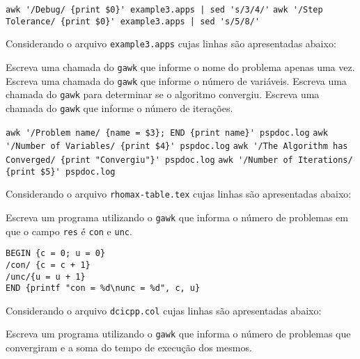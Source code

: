 \begin{Answer}[ref={0004}]
    \Question \lstinline+awk '/Debug/ {print $0}' example3.apps | sed 's/3/4/'+
    \Question \lstinline+awk '/Step Tolerance/ {print $0}' example3.apps | sed 's/5/8/'+
\end{Answer}
\begin{Exercise}[label={0005}, difficulty={1}, origin={gawk}]
  Considerando o arquivo \lstinline+example3.apps+ cujas linhas são
  apresentadas abaixo:
  
    \Question Escreva uma chamada do \lstinline+gawk+ que informe o nome do
      problema apenas uma vez.
    \Question Escreva uma chamada do \lstinline+gawk+ que informe o número de
      variáveis.
    \Question Escreva uma chamada do \lstinline+gawk+ para determinar se o algoritmo
      convergiu.
    \Question Escreva uma chamada do \lstinline+gawk+ que informe o número de
      iterações.
\end{Exercise}

\begin{Answer}[ref={0005}]
    \Question \lstinline+awk '/Problem name/ {name = $3}; END {print name}' pspdoc.log+
    \Question \lstinline+awk '/Number of Variables/ {print $4}' pspdoc.log+
    \Question \lstinline+awk '/The Algorithm has Converged/ {print "Convergiu"}' pspdoc.log+
    \Question \lstinline+awk '/Number of Iterations/ {print $5}' pspdoc.log+
\end{Answer}
\begin{Exercise}[label={0006}, difficulty={2}, origin={gawk}]
  Considerando o arquivo \lstinline+rhomax-table.tex+ cujas linhas são
  apresentadas abaixo:
  
  Escreva um programa utilizando o \lstinline+gawk+ que informa o número de
  problemas em que o campo \lstinline+res+ é \lstinline+con+ e \lstinline+unc+.
\end{Exercise}

\begin{Answer}[ref={0006}]
  \begin{lstlisting}
BEGIN {c = 0; u = 0}
/con/ {c = c + 1}
/unc/{u = u + 1}
END {printf "con = %d\nunc = %d", c, u}
  \end{lstlisting}
\end{Answer}
\begin{Exercise}[label={0007}, difficulty={2}, origin={gawk}]
  Considerando o arquivo \lstinline+dcicpp.col+ cujas linhas são
  apresentadas abaixo:
  
  Escreva um programa utilizando o \lstinline+gawk+ que informa o número de
  problemas que convergiram e a soma do tempo de execução dos mesmos.
\end{Exercise}

